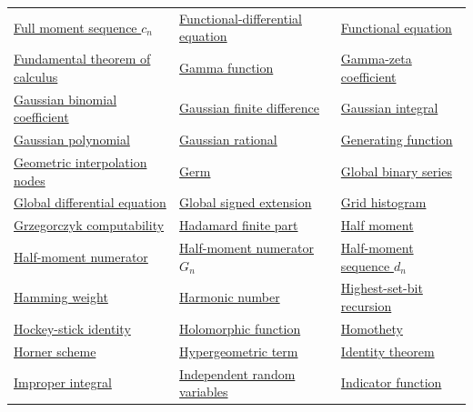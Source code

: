 \documentclass[11pt,oneside]{article}
\begin{document}
\begin{longtable}{p{}p{}p{}}
\hyperlink{gls:full-moment-sequence-c}{Full moment sequence $c_n$} & \hyperlink{gls:functional-differential-equation}{Functional-differential equation} & \hyperlink{gls:functional-equation}{Functional equation} \\
\hyperlink{gls:fundamental-theorem-of-calculus}{Fundamental theorem of calculus} & \hyperlink{gls:gamma-function}{Gamma function} & \hyperlink{gls:gamma-zeta-coefficient}{Gamma-zeta coefficient} \\
\hyperlink{gls:gaussian-binomial-coefficient}{Gaussian binomial coefficient} & \hyperlink{gls:gaussian-finite-difference}{Gaussian finite difference} & \hyperlink{gls:gaussian-integral}{Gaussian integral} \\
\hyperlink{gls:gaussian-polynomial}{Gaussian polynomial} & \hyperlink{gls:gaussian-rational}{Gaussian rational} & \hyperlink{gls:generating-function}{Generating function} \\
\hyperlink{gls:geometric-interpolation-nodes}{Geometric interpolation nodes} & \hyperlink{gls:germ}{Germ} & \hyperlink{gls:global-binary-series}{Global binary series} \\
\hyperlink{gls:global-differential-equation}{Global differential equation} & \hyperlink{gls:global-signed-extension}{Global signed extension} & \hyperlink{gls:grid-histogram}{Grid histogram} \\
\hyperlink{gls:grzegorczyk-computability}{Grzegorczyk computability} & \hyperlink{gls:hadamard-finite-part}{Hadamard finite part} & \hyperlink{gls:half-moment}{Half moment} \\
\hyperlink{gls:half-moment-numerator}{Half-moment numerator} & \hyperlink{gls:half-moment-numerator-g}{Half-moment numerator $G_n$} & \hyperlink{gls:half-moment-sequence-d}{Half-moment sequence $d_n$} \\
\hyperlink{gls:hamming-weight}{Hamming weight} & \hyperlink{gls:harmonic-number}{Harmonic number} & \hyperlink{gls:highest-set-bit-recursion}{Highest-set-bit recursion} \\
\hyperlink{gls:hockey-stick-identity}{Hockey-stick identity} & \hyperlink{gls:holomorphic-function}{Holomorphic function} & \hyperlink{gls:homothety}{Homothety} \\
\hyperlink{gls:horner-scheme}{Horner scheme} & \hyperlink{gls:hypergeometric-term}{Hypergeometric term} & \hyperlink{gls:identity-theorem}{Identity theorem} \\
\hyperlink{gls:improper-integral}{Improper integral} & \hyperlink{gls:independent-random-variables}{Independent random variables} & \hyperlink{gls:indicator-function}{Indicator function} \\

\end{longtable}
\end{document}
